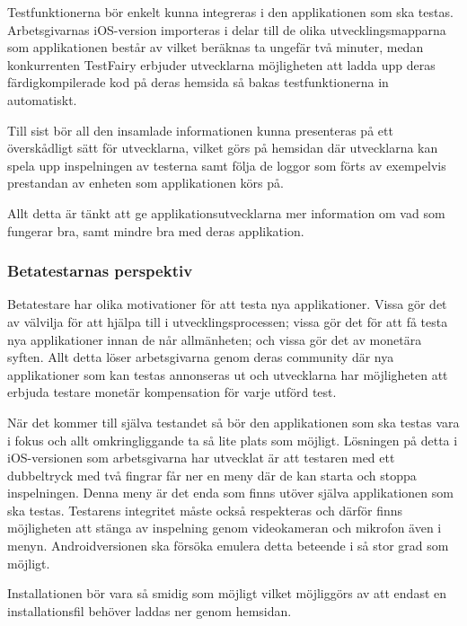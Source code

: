 Testfunktionerna bör enkelt kunna integreras i den applikationen som ska testas. Arbetsgivarnas iOS-version importeras i delar till de olika utvecklingsmapparna som applikationen består av vilket beräknas ta ungefär två minuter, medan konkurrenten TestFairy erbjuder utvecklarna möjligheten att ladda upp deras färdigkompilerade kod på deras hemsida så bakas testfunktionerna in automatiskt. 

Till sist bör all den insamlade informationen kunna presenteras på ett överskådligt sätt för utvecklarna, vilket görs på hemsidan där utvecklarna kan spela upp inspelningen av testerna samt följa de loggor som förts av exempelvis prestandan av enheten som applikationen körs på. 

Allt detta är tänkt att ge applikationsutvecklarna mer information om vad som fungerar bra, samt mindre bra med deras applikation. 

\subsubsection{Betatestarnas perspektiv}
Betatestare har olika motivationer för att testa nya applikationer. Vissa gör det av välvilja för att hjälpa till i utvecklingsprocessen; vissa gör det för att få testa nya applikationer innan de når allmänheten; och vissa gör det av monetära syften. Allt detta löser arbetsgivarna genom deras community där nya applikationer som kan testas annonseras ut och utvecklarna har möjligheten att erbjuda testare monetär kompensation för varje utförd test. 

När det kommer till själva testandet så bör den applikationen som ska testas vara i fokus och allt omkringliggande ta så lite plats som möjligt. Lösningen på detta i iOS-versionen som arbetsgivarna har utvecklat är att testaren med ett dubbeltryck med två fingrar får ner en meny där de kan starta och stoppa inspelningen. Denna meny är det enda som finns utöver själva applikationen som ska testas. Testarens integritet måste också respekteras och därför finns möjligheten att stänga av inspelning genom videokameran och mikrofon även i menyn. Androidversionen ska försöka emulera detta beteende i så stor grad som möjligt. 

Installationen bör vara så smidig som möjligt vilket möjliggörs av att endast en installationsfil behöver laddas ner genom hemsidan. 